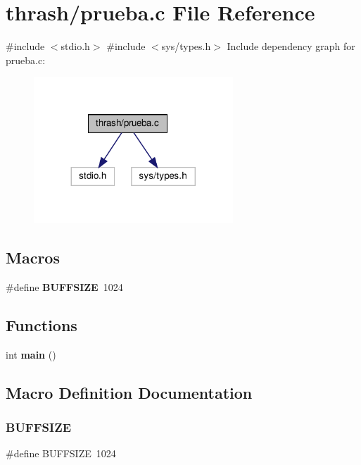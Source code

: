 \section{thrash/prueba.c File Reference}
\label{prueba_8c}
{\ttfamily \#include $<$stdio.\+h$>$}\newline
{\ttfamily \#include $<$sys/types.\+h$>$}\newline
Include dependency graph for prueba.\+c\+:\nopagebreak
\begin{figure}[H]
\begin{center}
\leavevmode
\includegraphics[width=212pt]{prueba_8c__incl}
\end{center}
\end{figure}
\subsection*{Macros}
\begin{DoxyCompactItemize}
\item 
\#define \textbf{ B\+U\+F\+F\+S\+I\+ZE}~1024
\end{DoxyCompactItemize}
\subsection*{Functions}
\begin{DoxyCompactItemize}
\item 
int \textbf{ main} ()
\end{DoxyCompactItemize}


\subsection{Macro Definition Documentation}
\mbox{\label{prueba_8c_a39912bfe2a55f30e269196f9141d845d}} 
\subsubsection{B\+U\+F\+F\+S\+I\+ZE}
{\footnotesize\ttfamily \#define B\+U\+F\+F\+S\+I\+ZE~1024}



